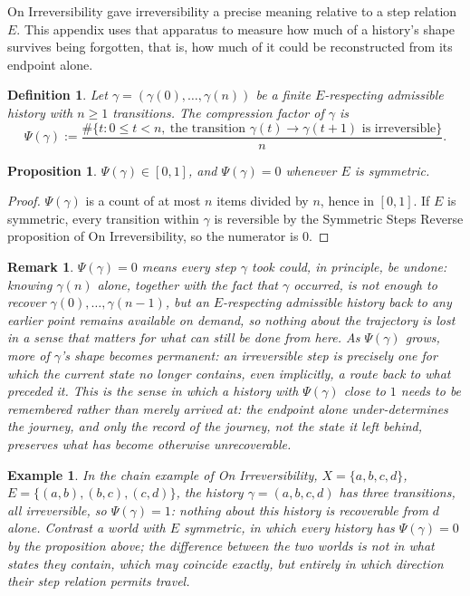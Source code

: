 \documentclass[11pt]{book}
\newtheorem*{appendixdefinition}{Definition}
\newtheorem*{appendixproposition}{Proposition}
\newtheorem*{appendixremark}{Remark}
\newtheorem*{appendixexample}{Example}
\begin{document}
On Irreversibility gave irreversibility a precise meaning relative to a step relation $E$. This appendix uses that apparatus to measure how much of a history's shape survives being forgotten, that is, how much of it could be reconstructed from its endpoint alone.

\begin{appendixdefinition}
Let $\gamma = (\gamma(0), \dots, \gamma(n))$ be a finite $E$-respecting admissible history with $n \geq 1$ transitions. The \emph{compression factor} of $\gamma$ is
\[
\Psi(\gamma) := \frac{\#\{t : 0 \leq t < n,\ \text{the transition } \gamma(t) \to \gamma(t+1) \text{ is irreversible}\}}{n}.
\]
\end{appendixdefinition}

\begin{appendixproposition}
$\Psi(\gamma) \in [0,1]$, and $\Psi(\gamma) = 0$ whenever $E$ is symmetric.
\end{appendixproposition}

\begin{proof}
$\Psi(\gamma)$ is a count of at most $n$ items divided by $n$, hence in $[0,1]$. If $E$ is symmetric, every transition within $\gamma$ is reversible by the Symmetric Steps Reverse proposition of On Irreversibility, so the numerator is $0$.
\end{proof}

\begin{appendixremark}
$\Psi(\gamma) = 0$ means every step $\gamma$ took could, in principle, be undone: knowing $\gamma(n)$ alone, together with the fact that $\gamma$ occurred, is not enough to recover $\gamma(0), \dots, \gamma(n-1)$, but an $E$-respecting admissible history back to any earlier point remains available on demand, so nothing about the trajectory is lost in a sense that matters for what can still be done from here. As $\Psi(\gamma)$ grows, more of $\gamma$'s shape becomes permanent: an irreversible step is precisely one for which the current state no longer contains, even implicitly, a route back to what preceded it. This is the sense in which a history with $\Psi(\gamma)$ close to $1$ needs to be remembered rather than merely arrived at: the endpoint alone under-determines the journey, and only the record of the journey, not the state it left behind, preserves what has become otherwise unrecoverable.
\end{appendixremark}

\begin{appendixexample}
In the chain example of On Irreversibility, $X = \{a,b,c,d\}$, $E = \{(a,b),(b,c),(c,d)\}$, the history $\gamma = (a,b,c,d)$ has three transitions, all irreversible, so $\Psi(\gamma) = 1$: nothing about this history is recoverable from $d$ alone. Contrast a world with $E$ symmetric, in which every history has $\Psi(\gamma) = 0$ by the proposition above; the difference between the two worlds is not in what states they contain, which may coincide exactly, but entirely in which direction their step relation permits travel.
\end{appendixexample}
\end{document}
